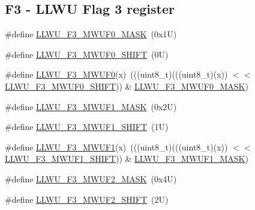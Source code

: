 \subsection*{F3 -\/ L\+L\+WU Flag 3 register}
\begin{DoxyCompactItemize}
\item 
\#define \mbox{\hyperlink{group___l_l_w_u___register___masks_ga1bb6bf136de15f4cc67eee67d53361a9}{L\+L\+W\+U\+\_\+\+F3\+\_\+\+M\+W\+U\+F0\+\_\+\+M\+A\+SK}}~(0x1\+U)
\item 
\#define \mbox{\hyperlink{group___l_l_w_u___register___masks_ga3b2c7982efa30073491d05e0dbc698e8}{L\+L\+W\+U\+\_\+\+F3\+\_\+\+M\+W\+U\+F0\+\_\+\+S\+H\+I\+FT}}~(0\+U)
\item 
\#define \mbox{\hyperlink{group___l_l_w_u___register___masks_ga3e088b69ca585116274b771ce4915311}{L\+L\+W\+U\+\_\+\+F3\+\_\+\+M\+W\+U\+F0}}(x)~(((uint8\+\_\+t)(((uint8\+\_\+t)(x)) $<$$<$ \mbox{\hyperlink{group___l_l_w_u___register___masks_ga3b2c7982efa30073491d05e0dbc698e8}{L\+L\+W\+U\+\_\+\+F3\+\_\+\+M\+W\+U\+F0\+\_\+\+S\+H\+I\+FT}})) \& \mbox{\hyperlink{group___l_l_w_u___register___masks_ga1bb6bf136de15f4cc67eee67d53361a9}{L\+L\+W\+U\+\_\+\+F3\+\_\+\+M\+W\+U\+F0\+\_\+\+M\+A\+SK}})
\item 
\#define \mbox{\hyperlink{group___l_l_w_u___register___masks_gafe847acbd5a46291dd05b8ab682efffe}{L\+L\+W\+U\+\_\+\+F3\+\_\+\+M\+W\+U\+F1\+\_\+\+M\+A\+SK}}~(0x2\+U)
\item 
\#define \mbox{\hyperlink{group___l_l_w_u___register___masks_ga6de4a2380bde727b70758cd1c818c859}{L\+L\+W\+U\+\_\+\+F3\+\_\+\+M\+W\+U\+F1\+\_\+\+S\+H\+I\+FT}}~(1\+U)
\item 
\#define \mbox{\hyperlink{group___l_l_w_u___register___masks_ga0102aac1d58b1c1a89c197c845f832a6}{L\+L\+W\+U\+\_\+\+F3\+\_\+\+M\+W\+U\+F1}}(x)~(((uint8\+\_\+t)(((uint8\+\_\+t)(x)) $<$$<$ \mbox{\hyperlink{group___l_l_w_u___register___masks_ga6de4a2380bde727b70758cd1c818c859}{L\+L\+W\+U\+\_\+\+F3\+\_\+\+M\+W\+U\+F1\+\_\+\+S\+H\+I\+FT}})) \& \mbox{\hyperlink{group___l_l_w_u___register___masks_gafe847acbd5a46291dd05b8ab682efffe}{L\+L\+W\+U\+\_\+\+F3\+\_\+\+M\+W\+U\+F1\+\_\+\+M\+A\+SK}})
\item 
\#define \mbox{\hyperlink{group___l_l_w_u___register___masks_ga3414123c30550a3dea14d84f931e2a0c}{L\+L\+W\+U\+\_\+\+F3\+\_\+\+M\+W\+U\+F2\+\_\+\+M\+A\+SK}}~(0x4\+U)
\item 
\#define \mbox{\hyperlink{group___l_l_w_u___register___masks_gac83dee08de7a4bdce21d454a9cfab059}{L\+L\+W\+U\+\_\+\+F3\+\_\+\+M\+W\+U\+F2\+\_\+\+S\+H\+I\+FT}}~(2\+U)

\end{DoxyCompactItemize}
